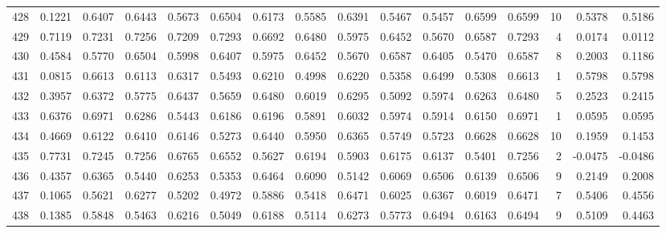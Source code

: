 \begin{tabular}{lrrrrrrrrrrrrrrr}
428 &      0.1221 &  0.6407 &  0.6443 &  0.5673 &  0.6504 &  0.6173 &  0.5585 &  0.6391 &  0.5467 &  0.5457 &   0.6599 &     0.6599 &     10 &                    0.5378 &                     0.5186 \\
429 &      0.7119 &  0.7231 &  0.7256 &  0.7209 &  0.7293 &  0.6692 &  0.6480 &  0.5975 &  0.6452 &  0.5670 &   0.6587 &     0.7293 &      4 &                    0.0174 &                     0.0112 \\
430 &      0.4584 &  0.5770 &  0.6504 &  0.5998 &  0.6407 &  0.5975 &  0.6452 &  0.5670 &  0.6587 &  0.6405 &   0.5470 &     0.6587 &      8 &                    0.2003 &                     0.1186 \\
431 &      0.0815 &  0.6613 &  0.6113 &  0.6317 &  0.5493 &  0.6210 &  0.4998 &  0.6220 &  0.5358 &  0.6499 &   0.5308 &     0.6613 &      1 &                    0.5798 &                     0.5798 \\
432 &      0.3957 &  0.6372 &  0.5775 &  0.6437 &  0.5659 &  0.6480 &  0.6019 &  0.6295 &  0.5092 &  0.5974 &   0.6263 &     0.6480 &      5 &                    0.2523 &                     0.2415 \\
433 &      0.6376 &  0.6971 &  0.6286 &  0.5443 &  0.6186 &  0.6196 &  0.5891 &  0.6032 &  0.5974 &  0.5914 &   0.6150 &     0.6971 &      1 &                    0.0595 &                     0.0595 \\
434 &      0.4669 &  0.6122 &  0.6410 &  0.6146 &  0.5273 &  0.6440 &  0.5950 &  0.6365 &  0.5749 &  0.5723 &   0.6628 &     0.6628 &     10 &                    0.1959 &                     0.1453 \\
435 &      0.7731 &  0.7245 &  0.7256 &  0.6765 &  0.6552 &  0.5627 &  0.6194 &  0.5903 &  0.6175 &  0.6137 &   0.5401 &     0.7256 &      2 &                   -0.0475 &                    -0.0486 \\
436 &      0.4357 &  0.6365 &  0.5440 &  0.6253 &  0.5353 &  0.6464 &  0.6090 &  0.5142 &  0.6069 &  0.6506 &   0.6139 &     0.6506 &      9 &                    0.2149 &                     0.2008 \\
437 &      0.1065 &  0.5621 &  0.6277 &  0.5202 &  0.4972 &  0.5886 &  0.5418 &  0.6471 &  0.6025 &  0.6367 &   0.6019 &     0.6471 &      7 &                    0.5406 &                     0.4556 \\
438 &      0.1385 &  0.5848 &  0.5463 &  0.6216 &  0.5049 &  0.6188 &  0.5114 &  0.6273 &  0.5773 &  0.6494 &   0.6163 &     0.6494 &      9 &                    0.5109 &                     0.4463 \\

\end{tabular}
